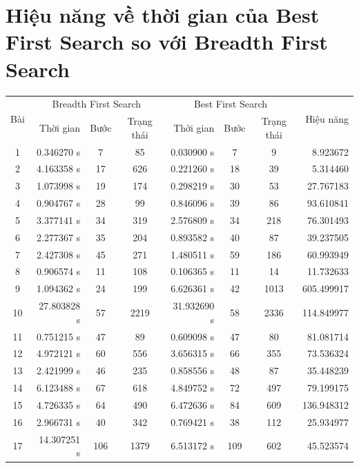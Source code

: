 \documentclass[11pt,a4paper]{article}
\begin{document}
\section {Hiệu năng về thời gian của Best First Search so với Breadth First Search }
\begin{center}
	\begin{tabular}{|c|r|c|c|r|c|c|r|}
		\hline
	\multirow{2}{1 cm}{ Bài} & \multicolumn{3}{|c|}{Breadth First Search} & \multicolumn{3}{|c|}{Best First Search} & \multirow{2}{1 cm}{Hiệu năng} \\	
	& Thời gian  & Bước & Trạng thái & Thời gian & Bước & Trạng thái & \\ \hline
		1   & 0.346270 s	& 7		& 85	& 0.030900 s	& 7		& 9 	& 8.923672 \\ \hline
		2   & 4.163358 s	& 17	& 626	& 0.221260 s	& 18	& 39	& 5.314460 \\ \hline
		3	& 1.073998 s	& 19	& 174	& 0.298219 s	& 30	& 53	& 27.767183 \\ \hline
		4 	& 0.904767 s	& 28	& 99	& 0.846096 s	& 39	& 86	& 93.610841 \\ \hline
		5	& 3.377141 s	& 34	& 319	& 2.576809 s	& 34	& 218	& 76.301493 \\ \hline
		6	& 2.277367 s	& 35	& 204	& 0.893582 s	& 40	& 87	& 39.237505 \\ \hline
		7	& 2.427308 s	& 45	& 271	& 1.480511 s	& 59	& 186	& 60.993949 \\ \hline
		8	& 0.906574 s	& 11	& 108	& 0.106365 s	& 11	& 14	& 11.732633 \\ \hline
		9	& 1.094362 s	& 24	& 199	& 6.626361 s	& 42	& 1013	& 605.499917 \\ \hline
		10	& 27.803828 s	& 57	& 2219	& 31.932690 s	& 58	& 2336	& 114.849977 \\ \hline
		11	& 0.751215 s	& 47	& 89	& 0.609098 s	& 47	& 80	& 81.081714 \\ \hline
		12	& 4.972121 s	& 60	& 556	& 3.656315 s	& 66	& 355	& 73.536324 \\ \hline
		13	& 2.421999 s	& 46	& 235	& 0.858556 s	& 48	& 87	& 35.448239 \\ \hline
		14	& 6.123488 s	& 67	& 618	& 4.849752 s	& 72	& 497	& 79.199175 \\ \hline
		15	& 4.726335 s	& 64	& 490	& 6.472636 s	& 84	& 609	& 136.948312 \\ \hline
		16	& 2.966731 s	& 40	& 342	& 0.769421 s	& 38	& 112	& 25.934977 \\ \hline
		17	& 14.307251 s	& 106	& 1379	& 6.513172 s	& 109	& 602	& 45.523574 \\ \hline

\end{tabular}
\end{center}
\end{document}
